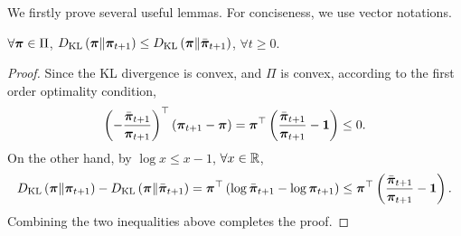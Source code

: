 We firstly prove several useful lemmas. For conciseness, we use vector notations.

\begin{lem}
\label{lem:kl_difference_non_positive}
$\forall {\boldsymbol{\pi}} \in \Pi$, $D_{\mathrm{KL}}\left( {\boldsymbol{\pi}} \middle\| {\boldsymbol{\pi}}_{t+1} \right) \le D_{\mathrm{KL}}\left( {\boldsymbol{\pi}} \middle\| \bar{{\boldsymbol{\pi}}}_{t+1} \right)$, $\forall t \ge 0$.
\end{lem}
\begin{proof}
Since the KL divergence is convex, and $\Pi$ is convex, according to the first order optimality condition,
\begin{equation*}
\begin{split}
    \left( - \frac{\bar{{\boldsymbol{\pi}}}_{t+1}}{{\boldsymbol{\pi}}_{t+1}} \right)^\top \left( {\boldsymbol{\pi}}_{t+1} - {\boldsymbol{\pi}} \right) = {\boldsymbol{\pi}}^\top \left( \frac{\bar{{\boldsymbol{\pi}}}_{t+1}}{{\boldsymbol{\pi}}_{t+1}} - {\mathbf{1}} \right) \le 0.
\end{split}
\end{equation*}
On the other hand, by $\log{x} \le x - 1$, $\forall x \in {\mathbb{R}}$,
\begin{equation*}
\begin{split}
    D_{\mathrm{KL}}\left( {\boldsymbol{\pi}} \middle\| {\boldsymbol{\pi}}_{t+1} \right) - D_{\mathrm{KL}}\left( {\boldsymbol{\pi}} \middle\| \bar{{\boldsymbol{\pi}}}_{t+1} \right) = {\boldsymbol{\pi}}^\top \left( \log{\bar{{\boldsymbol{\pi}}}_{t+1}} - \log{{\boldsymbol{\pi}}_{t+1}} \right) \le {\boldsymbol{\pi}}^\top \left( \frac{\bar{{\boldsymbol{\pi}}}_{t+1}}{{\boldsymbol{\pi}}_{t+1}} - {\mathbf{1}} \right).
\end{split}
\end{equation*}
Combining the two inequalities above completes the proof.
\end{proof}

